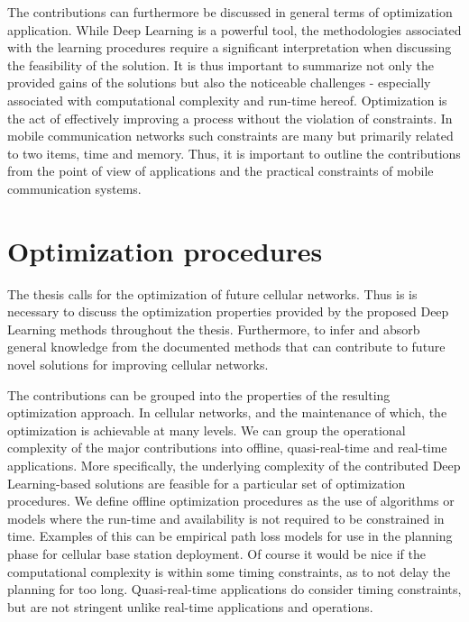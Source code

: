 The contributions can furthermore be discussed in general terms of optimization application. While Deep Learning is a powerful tool, the methodologies associated with the learning procedures require a significant interpretation when discussing the feasibility of the solution. It is thus important to summarize not only the provided gains of the solutions but also the noticeable challenges - especially associated with computational complexity and run-time hereof. Optimization is the act of effectively improving a process without the violation of constraints. In mobile communication networks such constraints are many but primarily related to two items, time and memory. Thus, it is important to outline the contributions from the point of view of applications and the practical constraints of mobile communication systems.

\section{Optimization procedures}
The thesis calls for the optimization of future cellular networks. Thus is is necessary to discuss the optimization properties provided by the proposed Deep Learning methods throughout the thesis. Furthermore, to infer and absorb general knowledge from the documented methods that can contribute to future novel solutions for improving cellular networks.

The contributions can be grouped into the properties of the resulting optimization approach. In cellular networks, and the maintenance of which, the optimization is achievable at many levels. We can group the operational complexity of the major contributions into offline, quasi-real-time and real-time applications. More specifically, the underlying complexity of the contributed Deep Learning-based solutions are feasible for a particular set of optimization procedures. We define offline optimization procedures as the use of algorithms or models where the run-time and availability is not required to be constrained in time. Examples of this can be empirical path loss models for use in the planning phase for cellular base station deployment. Of course it would be nice if the computational complexity is within some timing constraints, as to not delay the planning for too long. Quasi-real-time applications do consider timing constraints, but are not stringent unlike real-time applications and operations. 

